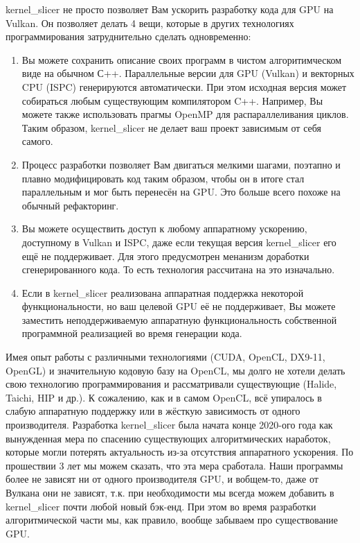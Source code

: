 \documentclass[11pt,fleqn,english,russian]{report} %
\begin{document}
kernel\_slicer не просто позволяет Вам ускорить разработку кода для GPU на Vulkan. Он позволяет делать 4 вещи, которые в других технологиях программирования затруднительно сделать одновременно:

\begin{enumerate}

\item Вы можете сохранить описание своих программ в чистом алгоритимческом виде на обычном С++. Параллельные версии для GPU (Vulkan) и векторных CPU (ISPC) генерируются автоматически. При этом исходная версия может собираться любым существующим компилятором C++. Например, Вы можете также использовать прагмы OpenMP для распараллеливания циклов. Таким образом, kernel\_slicer не делает ваш проект зависимым от себя самого.

\item Процесс разработки позволяет Вам двигаться мелкими шагами, поэтапно и плавно модифицировать код таким образом, чтобы он в итоге стал параллельным и мог быть перенесён на GPU. Это больше всего похоже на обычный рефакторинг.

\item Вы можете осуществить доступ к любому аппаратному ускорению, доступному в Vulkan и ISPC, даже если текущая версия kernel\_slicer его ещё не поддерживает. Для этого предусмотрен менанизм доработки сгенерированного кода. То есть технология рассчитана на это изначально.

\item Если в kernel\_slicer реализована аппаратная поддержка некоторой функциональности, но ваш целевой GPU её не поддерживает, Вы можете заместить неподдерживаемую аппаратную функциональность собственной программной реализацией во время генерации кода.
\end{enumerate}

\begin{remark}Имея опыт работы с различными технологиями (CUDA, OpenCL, DX9-11, OpenGL) и значительную кодовую базу на OpenCL, мы долго не хотели делать свою технологию программирования и рассматривали существующие (Halide, Taichi, HIP и др.). К сожалению, как и в самом OpenCL, всё упиралось в слабую аппаратную поддержку или в жёсткую зависимость от одного производителя. Разработка kernel\_slicer была начата конце 2020-ого года как вынужденная мера по спасению существующих алгоритмических наработок, которые могли потерять актуальность из-за отсутствия аппаратного ускорения. По прошествии 3 лет мы можем сказать, что эта мера сработала. Наши программы более не зависят ни от одного производителя GPU, и вобщем-то, даже от Вулкана они не зависят, т.к. при необходимости мы всегда можем добавить в kernel\_slicer почти любой новый бэк-енд. При этом во время разработки алгоритмической части мы, как правило, вообще забываем про существование GPU.
\end{remark}
\end{document}
